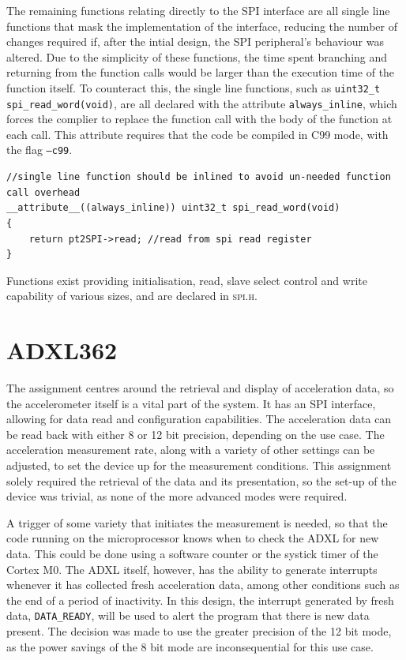 \documentclass[11pt,british]{report}
\begin{document}
The remaining functions relating directly to the SPI interface are all single line functions that mask the implementation of the interface, reducing the number of changes required if, after the intial design, the SPI peripheral's behaviour was altered. Due to the simplicity of these functions, the time spent branching and returning from the function calls would be larger than the execution time of the function itself. To counteract this, the single line functions, such as \lstinline[style={c-style}]|uint32_t spi_read_word(void)|, are all declared with the attribute \texttt{always\_inline}, which forces the complier to replace the function call with the body of the function at each call. This attribute requires that the code be compiled in C99 mode, with the flag \texttt{--c99}.
\begin{lstlisting}[style={c-style}]
//single line function should be inlined to avoid un-needed function call overhead
__attribute__((always_inline)) uint32_t spi_read_word(void)
{
	return pt2SPI->read; //read from spi read register
}
\end{lstlisting}
Functions exist providing initialisation, read, slave select control and write capability of various sizes, and are declared in \textsc{spi.h}.

\section*{ADXL362}
The assignment centres around the retrieval and display of acceleration data, so the accelerometer itself is a vital part of the system. It has an SPI interface, allowing for data read and configuration capabilities. The acceleration data can be read back with either 8 or 12 bit precision, depending on the use case. The acceleration measurement rate, along with a variety of other settings can be adjusted, to set the device up for the measurement conditions. This assignment solely required the retrieval of the data and its presentation, so the set-up of the device was trivial, as none of the more advanced modes were required.

A trigger of some variety that initiates the measurement is needed, so that the code running on the microprocessor knows when to check the ADXL for new data. This could be done using a software counter or the systick timer of the Cortex M0. The ADXL itself, however, has the ability to generate interrupts whenever it has collected fresh acceleration data, among other conditions such as the end of a period of inactivity. In this design, the interrupt generated by fresh data, \texttt{DATA\_READY}, will be used to alert the program that there is new data present. The decision was made to use the greater precision of the 12 bit mode, as the power savings of the 8 bit mode are inconsequential for this use case.
\end{document}
